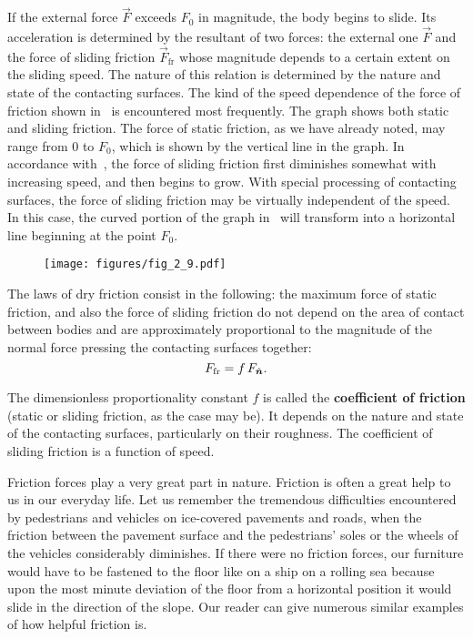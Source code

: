 If the external force $\vec{F}$ exceeds $F_0$ in magnitude, the body begins to slide. Its acceleration is determined by the resultant of two forces: the external one $\vec{F}$ and the force of sliding friction $\vec{F}_{\text{fr}}$ whose magnitude depends to a certain extent on the sliding speed. The nature of this relation is determined by the nature and state of the contacting surfaces. The kind of the speed dependence of the force of friction shown in~ is encountered most frequently. The graph shows both static and sliding friction. The force of static friction, as we have already noted, may range from $0$ to $F_0$, which is shown by the vertical line in the graph. In accordance with~, the force of sliding friction first diminishes somewhat with increasing speed, and then begins to grow. With special processing of contacting surfaces, the force of sliding friction may be virtually independent of the speed. In this case, the curved portion of the graph in~ will transform into a horizontal line beginning at the point $F_0$.

\begin{figure}[t]
	\begin{center}
		\texttt{[image: figures/fig\_2\_9.pdf]}
		\caption[]{}
		\label{fig:2_9}
	\end{center}
	\vspace{-0.7cm}
\end{figure}

The laws of dry friction consist in the following: the maximum force of static friction, and also the force of sliding friction do not depend on the area of contact between bodies and are approximately proportional to the magnitude of the normal force pressing the contacting surfaces together:
\begin{equation}\label{eq:2_35}
F_{\text{fr}} = f\,F_{\hat{\boldsymbol{n}}}.
\end{equation}

\noindent
The dimensionless proportionality constant $f$ is called the \textbf{coefficient of friction} (static or sliding friction, as the case may be). It depends on the nature and state of the contacting surfaces, particularly on their roughness. The coefficient of sliding friction is a function of speed.

Friction forces play a very great part in nature. Friction is often a great help to us in our everyday life. Let us remember the tremendous difficulties encountered by pedestrians and vehicles on ice-covered pavements and roads, when the friction between the pavement surface and the pedestrians' soles or the wheels of the vehicles considerably diminishes. If there were no friction forces, our furniture would have to be fastened to the floor like on a ship on a rolling sea because upon the most minute deviation of the floor from a horizontal position it would slide in the direction of the slope. Our reader can give numerous similar examples of how helpful friction is.

